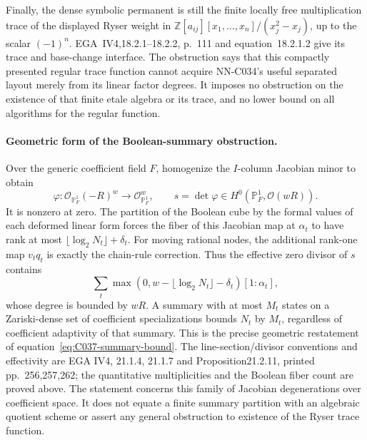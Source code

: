 \begin{geometricstatement}[NN-C037]
Finally, the dense symbolic permanent is still the finite locally free multiplication trace of the displayed Ryser weight in
$\mathbb Z[a_{ij}][x_1,\ldots,x_n]/(x_j^2-x_j)$, up to the scalar $(-1)^n$. EGA~IV4,18.2.1--18.2.2, p.~111 and equation~18.2.1.2 give its trace and base-change interface. The obstruction says that this compactly presented regular trace function cannot acquire NN-C034's useful separated layout merely from its linear factor degrees. It imposes no obstruction on the existence of that finite etale algebra or its trace, and no lower bound on all algorithms for the regular function.\paragraph{Geometric form of the Boolean-summary obstruction.}
Over the generic coefficient field $F$, homogenize the
$I$-column Jacobian minor to obtain
\[
 \varphi:\mathcal O_{\mathbb P^1_F}(-R)^w
               \longrightarrow\mathcal O_{\mathbb P^1_F}^{w},
 \qquad
       s=\det\varphi\in H^0(\mathbb P^1_F,\mathcal O(wR)).
\]
It is nonzero at zero. The partition of the Boolean cube
by the formal values of each deformed linear form
forces the fiber of this Jacobian map at $\alpha_t$ to
have rank at most $\lfloor\log_2N_t\rfloor+\delta_t$.
For moving rational nodes, the additional rank-one map
$v_tq_t$ is exactly the chain-rule correction. Thus the
effective zero divisor of $s$ contains
\[
 \sum_t
 \max(0,w-\lfloor\log_2N_t\rfloor-\delta_t)[1:\alpha_t],
\]
whose degree is bounded by $wR$. A summary with at most
$M_t$ states on a Zariski-dense set of coefficient
specializations bounds $N_t$ by $M_t$, regardless of
coefficient adaptivity of that summary. This is the precise
geometric restatement of equation~\eqref{eq:C037-summary-bound}.
The line-section/divisor conventions and effectivity are
EGA IV4, 21.1.4, 21.1.7 and Proposition21.2.11, printed
pp.~256,257,262; the quantitative multiplicities and the
Boolean fiber count are proved above. The statement concerns
this family of Jacobian degenerations over coefficient space.
It does not equate a finite summary partition with an
algebraic quotient scheme or assert any general obstruction
to existence of the Ryser trace function.



\end{geometricstatement}
